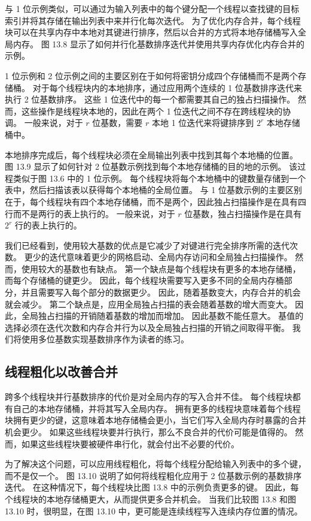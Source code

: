 与 1 位示例类似，可以通过为输入列表中的每个键分配一个线程以查找键的目标索引并将其存储在输出列表中来并行化每次迭代。 
为了优化内存合并，每个线程块可以在共享内存中本地对其键进行排序，然后以合并的方式将本地存储桶写入全局内存。 
图 13.8 显示了如何并行化基数排序迭代并使用共享内存优化内存合并的示例。

1 位示例和 2 位示例之间的主要区别在于如何将密钥分成四个存储桶而不是两个存储桶。 
对于每个线程块内的本地排序，通过应用两个连续的 1 位基数排序迭代来执行 2 位基数排序。 
这些 1 位迭代中的每一个都需要其自己的独占扫描操作。 
然而，这些操作是线程块本地的，因此在两个 1 位迭代之间不存在跨线程块的协调。 
一般来说，对于 $r$ 位基数，需要 $r$ 本地 1 位迭代来将键排序到 $2^{r}$ 本地存储桶中。

本地排序完成后，每个线程块必须在全局输出列表中找到其每个本地桶的位置。 
图 13.9 显示了如何针对 2 位基数示例找到每个本地存储桶的目的地的示例。 该过程类似于图 13.6 中的 1 位示例。 
每个线程块将每个本地桶中的键数量存储到一个表中，然后扫描该表以获得每个本地桶的全局位置。 
与 1 位基数示例的主要区别在于，每个线程块有四个本地存储桶，而不是两个，因此独占扫描操作是在具有四行而不是两行的表上执行的。 
一般来说，对于 $r$ 位基数，独占扫描操作是在具有 $2^{r}$ 行的表上执行的。

我们已经看到，使用较大基数的优点是它减少了对键进行完全排序所需的迭代次数。 
更少的迭代意味着更少的网格启动、全局内存访问和全局独占扫描操作。 然而，使用较大的基数也有缺点。 
第一个缺点是每个线程块有更多的本地存储桶，而每个存储桶的键更少。 
因此，每个线程块需要写入更多不同的全局内存桶部分，并且需要写入每个部分的数据更少。 
因此，随着基数变大，内存合并的机会就会减少。 第二个缺点是，应用全局独占扫描的表会随着基数的增大而变大。 
因此，全局独占扫描的开销随着基数的增加而增加。 因此基数不能任意大。 
基值的选择必须在迭代次数和内存合并行为以及全局独占扫描的开销之间取得平衡。 我们将使用多位基数实现基数排序作为读者的练习。

\subsection{线程粗化以改善合并}
跨多个线程块并行基数排序的代价是对全局内存的写入合并不佳。 每个线程块都有自己的本地存储桶，并将其写入全局内存。 
拥有更多的线程块意味着每个线程块拥有更少的键，这意味着本地存储桶会更小，当它们写入全局内存时暴露的合并机会更少。 
如果这些线程块要并行执行，那么不良合并的代价可能是值得的。 然而，如果这些线程块要被硬件串行化，就会付出不必要的代价。

为了解决这个问题，可以应用线程粗化，将每个线程分配给输入列表中的多个键，而不是仅一个。 
图 13.10 说明了如何将线程粗化应用于 2 位基数示例的基数排序迭代。 
在这种情况下，每个线程块比图 13.8 中的示例负责更多的键。 因此，每个线程块的本地存储桶更大，从而提供更多合并机会。 
当我们比较图 13.8 和图 13.10 时，很明显，在图 13.10 中，更可能是连续线程写入连续内存位置的情况。

